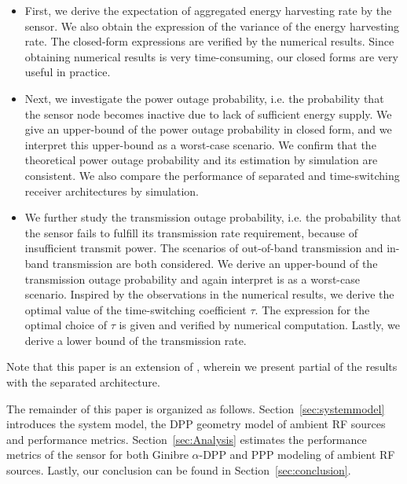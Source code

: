 \documentclass[12pt,draftclsnofoot,onecolumn]{IEEEtran}
\begin{document}
\begin{itemize}

\item First, we derive the expectation of aggregated energy harvesting rate by the sensor. We also obtain the expression of the variance of the energy harvesting rate. 
The closed-form expressions are verified by the numerical results. Since obtaining numerical results is very time-consuming, our closed forms are very useful in practice.



\item Next, we investigate the power outage probability, i.e. the probability that the sensor node becomes inactive due to lack of sufficient energy supply. We give an upper-bound of the power outage probability in closed form, and we interpret this upper-bound as a worst-case scenario. We confirm that the theoretical power outage probability and its estimation by simulation are consistent. We also compare the performance of separated and time-switching receiver architectures by simulation.

\item We further study the transmission outage probability, i.e. the probability that the sensor fails to fulfill its transmission rate requirement, because of insufficient transmit power. The scenarios of out-of-band transmission and in-band transmission are both considered. We derive an upper-bound of the transmission outage probability and again interpret is as a worst-case scenario. 
Inspired by the observations in the numerical results, we derive the optimal value of the time-switching coefficient $\tau$. The expression for the optimal choice of $\tau$ is given and verified by numerical computation. Lastly,
we derive a lower bound of the transmission rate.  

\end{itemize}

Note that this paper is an extension of \cite{ConfVersion}, wherein we present partial of the results with the separated architecture.





The remainder of this paper is organized as follows. Section~\ref{sec:systemmodel} introduces the system model, the DPP geometry model of ambient RF sources and performance metrics. Section~\ref{sec:Analysis} estimates the performance metrics of the sensor for both Ginibre $\alpha$-DPP and PPP modeling of ambient RF sources. 
Lastly, our conclusion can be found in Section~\ref{sec:conclusion}.
\end{document}
